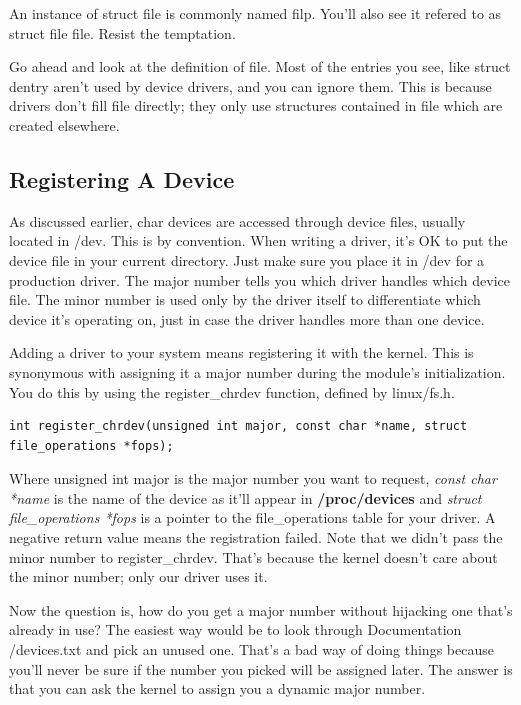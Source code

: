 \documentclass[11pt]{article}
\begin{document}
An instance of struct file is commonly named filp. You'll also see it refered to as struct file file. Resist the temptation.

Go ahead and look at the definition of file. Most of the entries you see, like struct dentry aren't used by device drivers, and you can ignore them. This is because drivers don't fill file directly; they only use structures contained in file which are created elsewhere.

\subsection{Registering A Device}
\label{sec:orgda75c13}
As discussed earlier, char devices are accessed through device files, usually located in /dev. This is by convention. When writing a driver, it's OK to put the device file in your current directory. Just make sure you place it in /dev for a production driver. The major number tells you which driver handles which device file. The minor number is used only by the driver itself to differentiate which device it's operating on, just in case the driver handles more than one device.

Adding a driver to your system means registering it with the kernel. This is synonymous with assigning it a major number during the module's initialization. You do this by using the register\_chrdev function, defined by linux/fs.h.

\begin{verbatim}
int register_chrdev(unsigned int major, const char *name, struct file_operations *fops);
\end{verbatim}

Where unsigned int major is the major number you want to request, \emph{const char *name} is the name of the device as it'll appear in \textbf{/proc/devices} and \emph{struct file\_operations *fops} is a pointer to the file\_operations table for your driver. A negative return value means the registration failed. Note that we didn't pass the minor number to register\_chrdev. That's because the kernel doesn't care about the minor number; only our driver uses it.

Now the question is, how do you get a major number without hijacking one that's already in use? The easiest way would be to look through Documentation /devices.txt and pick an unused one. That's a bad way of doing things because you'll never be sure if the number you picked will be assigned later. The answer is that you can ask the kernel to assign you a dynamic major number.
\end{document}
